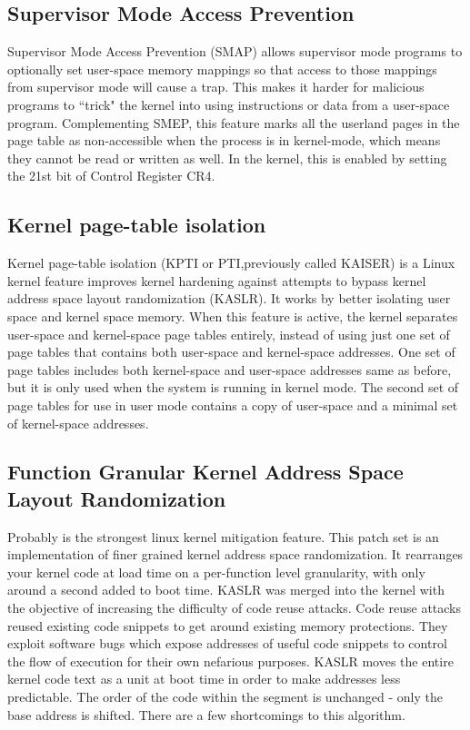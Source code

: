 \documentclass{masterthesis}
\begin{document}
\subsection{Supervisor Mode Access Prevention}
\label{subsect:SMAP}
Supervisor Mode Access Prevention (SMAP) allows supervisor mode programs to optionally set user-space memory mappings so that access to those mappings from supervisor mode will cause a trap. This makes it harder for malicious programs to ``trick" the kernel into using instructions or data from a user-space program.
Complementing SMEP, this feature marks all the userland pages in the page table as non-accessible when the process is in kernel-mode, which means they cannot be read or written as well. In the kernel, this is enabled by setting the 21st bit of Control Register CR4.

\subsection{Kernel page-table isolation}
\label{subsect:KPTI}
Kernel page-table isolation (KPTI or PTI,previously called KAISER) is a Linux kernel feature improves kernel hardening against attempts to bypass kernel address space layout randomization (KASLR). It works by better isolating user space and kernel space memory.
When this feature is active, the kernel separates user-space and kernel-space page tables entirely, instead of using just one set of page tables that contains both user-space and kernel-space addresses. One set of page tables includes both kernel-space and user-space addresses same as before, but it is only used when the system is running in kernel mode. The second set of page tables for use in user mode contains a copy of user-space and a minimal set of kernel-space addresses.

\subsection{Function Granular Kernel Address Space Layout Randomization}
\label{subsect:FG-KASLR}
Probably is the strongest linux kernel mitigation feature.
This patch set is an implementation of finer grained kernel address space randomization. It rearranges your kernel code at load time on a per-function level granularity, with only around a second added to boot time.
KASLR was merged into the kernel with the objective of increasing the difficulty of code reuse attacks. Code reuse attacks reused existing code snippets to get around existing memory protections. They exploit software bugs which expose addresses of useful code snippets to control the flow of execution for their own nefarious purposes. KASLR moves the entire kernel
code text as a unit at boot time in order to make addresses less predictable.
The order of the code within the segment is unchanged - only the base address is shifted. There are a few shortcomings to this algorithm.
\end{document}
